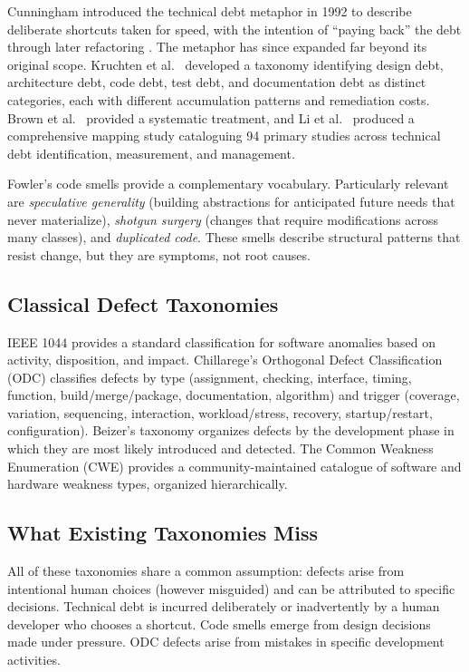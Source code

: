 \documentclass[11pt, a4paper, logo, copyright]{googledeepmind}
\begin{document}
Cunningham introduced the technical debt metaphor in 1992 to describe deliberate shortcuts taken for speed, with the intention of ``paying back'' the debt through later refactoring \citep{cunningham1992}. The metaphor has since expanded far beyond its original scope. Kruchten et al.\ \citep{kruchten2012} developed a taxonomy identifying design debt, architecture debt, code debt, test debt, and documentation debt as distinct categories, each with different accumulation patterns and remediation costs. Brown et al.\ \citep{brown2010} provided a systematic treatment, and Li et al.\ \citep{li2015} produced a comprehensive mapping study cataloguing 94 primary studies across technical debt identification, measurement, and management.

Fowler's code smells \citep{fowler1999} provide a complementary vocabulary. Particularly relevant are \emph{speculative generality} (building abstractions for anticipated future needs that never materialize), \emph{shotgun surgery} (changes that require modifications across many classes), and \emph{duplicated code}. These smells describe structural patterns that resist change, but they are symptoms, not root causes.

\subsection{Classical Defect Taxonomies}

IEEE 1044 \citep{ieee1044} provides a standard classification for software anomalies based on activity, disposition, and impact. Chillarege's Orthogonal Defect Classification (ODC) \citep{chillarege1992} classifies defects by type (assignment, checking, interface, timing, function, build/merge/package, documentation, algorithm) and trigger (coverage, variation, sequencing, interaction, workload/stress, recovery, startup/restart, configuration). Beizer's taxonomy \citep{beizer1990} organizes defects by the development phase in which they are most likely introduced and detected. The Common Weakness Enumeration (CWE) \citep{cwe2024} provides a community-maintained catalogue of software and hardware weakness types, organized hierarchically.

\subsection{What Existing Taxonomies Miss}

All of these taxonomies share a common assumption: defects arise from intentional human choices (however misguided) and can be attributed to specific decisions. Technical debt is incurred deliberately or inadvertently by a human developer who chooses a shortcut. Code smells emerge from design decisions made under pressure. ODC defects arise from mistakes in specific development activities.
\end{document}
